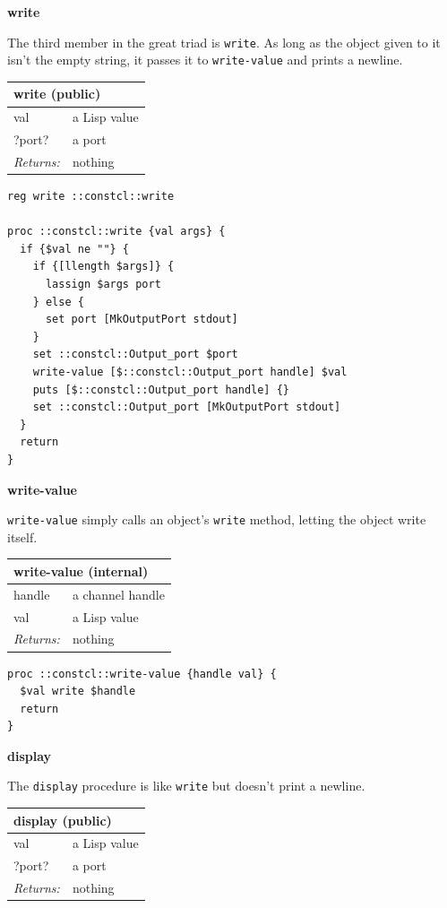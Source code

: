 \documentclass[twoside,9pt]{report}
\begin{document}
\textbf{write}


The third member in the great triad is \texttt{write}. As long as the object given to it isn't the empty string, it passes it to \texttt{write-value} and prints a newline.

\begin{tabular}{ |l l| }
\hline
\multicolumn{2}{|l|}{write (public)} \\
\hline
val & a Lisp value \\
?port? & a port \\
\textit{Returns:} & nothing \\
\hline
\end{tabular}

\noindent\makebox[\linewidth]{\rule{\linewidth}{0.4pt}}
\begin{lstlisting}
reg write ::constcl::write
 
proc ::constcl::write {val args} {
  if {$val ne ""} {
    if {[llength $args]} {
      lassign $args port
    } else {
      set port [MkOutputPort stdout]
    }
    set ::constcl::Output_port $port
    write-value [$::constcl::Output_port handle] $val
    puts [$::constcl::Output_port handle] {}
    set ::constcl::Output_port [MkOutputPort stdout]
  }
  return
}
\end{lstlisting}
\noindent\makebox[\linewidth]{\rule{\linewidth}{0.4pt}}

\textbf{write-value}


\texttt{write-value} simply calls an object's \texttt{write} method, letting the object write itself.

\begin{tabular}{ |l l| }
\hline
\multicolumn{2}{|l|}{write-value (internal)} \\
\hline
handle & a channel handle \\
val & a Lisp value \\
\textit{Returns:} & nothing \\
\hline
\end{tabular}

\noindent\makebox[\linewidth]{\rule{\linewidth}{0.4pt}}
\begin{lstlisting}
proc ::constcl::write-value {handle val} {
  $val write $handle
  return
}
\end{lstlisting}
\noindent\makebox[\linewidth]{\rule{\linewidth}{0.4pt}}

\textbf{display}


The \texttt{display} procedure is like \texttt{write} but doesn't print a newline.

\begin{tabular}{ |l l| }
\hline
\multicolumn{2}{|l|}{display (public)} \\
\hline
val & a Lisp value \\
?port? & a port \\
\textit{Returns:} & nothing \\
\hline
\end{tabular}
\end{document}
